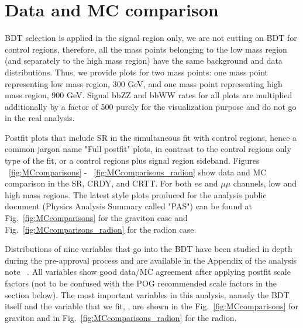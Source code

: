 \section{Data and MC comparison\label{sec:compareDataMC}}
BDT selection is applied in the signal region only, we are not cutting on BDT for control regions, therefore, all the mass
points belonging to the low mass region (and separately to the high mass region) have the same background and data distributions. Thus, we provide plots for two mass points: one mass point representing low mass region, 300 GeV, and one mass point representing high mass region, 900 GeV. 
Signal bbZZ and bbWW rates for all plots are multiplied additionally by a factor of 500 purely for the visualization purpose and do not go in the real analysis. 


Postfit plots that include SR in the simultaneous fit with control regions, hence a common jargon name "Full postfit" plots, in contrast to the control regions only type of the fit, or a control regions plus signal region sideband. Figures ~\ref{fig:MCcomparisons} - ~\ref{fig:MCcomparisons_radion} show data and MC comparison in the SR, CRDY, and CRTT. For both $ee$ and $\mu\mu$ channels, low and high mass regions. The latest style plots produced for the analysis public document (Physics Analysis Summary called "PAS") can be found at Fig.~\ref{fig:MCcomparisons} for the graviton case and Fig.~\ref{fig:MCcomparisons_radion} for the radion case. 



Distributions of nine variables that go into the BDT have been studied in depth during the pre-approval process and are available in the Appendix of the analysis note ~\cite{bbZZAN}. All variables show good data/MC agreement after applying postfit scale factors (not to be confused with the POG recommended scale factors in the section below). %
The most important variables in this analysis, namely the BDT itself and the variable that we fit, \mTHH, are shown in the Fig.~\ref{fig:MCcomparisons} for graviton and in Fig.~\ref{fig:MCcomparisons_radion} for the radion. 


